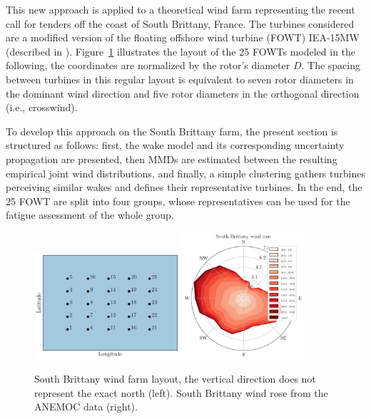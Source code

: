 This new approach is applied to a theoretical wind farm representing the recent call for tenders off the coast of South Brittany, France. 
The turbines considered are a modified version of the floating offshore wind turbine (FOWT) IEA-15MW (described in \citealp{kim_natarajan_2022}). 
Figure~\ref{fig:SB-farm} illustrates the layout of the 25 FOWTs modeled in the following, the coordinates are normalized by the rotor's diameter $D$. 
The spacing between turbines in this regular layout is equivalent to seven rotor diameters in the dominant wind direction and five rotor diameters in the orthogonal direction (i.e., crosswind). 

To develop this approach on the South Brittany farm, the present section is structured as follows: 
first, the wake model and its corresponding uncertainty propagation are presented, 
then MMDs are estimated between the resulting empirical joint wind distributions, 
and finally, a simple clustering gathers turbines perceiving similar wakes and defines their representative turbines. 
In the end, the 25 FOWT are split into four groups, whose representatives can be used for the fatigue assessment of the whole group. 

\begin{figure}
    \centering
    \includegraphics[width=0.48\textwidth]{part2/figures/WAKE/layout_SB.png}
    \includegraphics[width=0.4\textwidth]{../numerical_experiments/chapter3/figures/SB_wind_rose.png}
    \caption{South Brittany wind farm layout, the vertical direction does not represent the exact north (left). South Brittany wind rose from the ANEMOC data (right).}
    \label{fig:SB-farm}
\end{figure}


